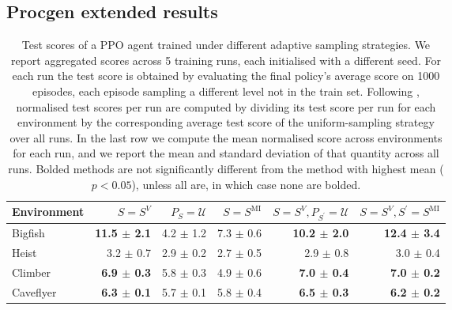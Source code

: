 \subsection{Procgen extended results}\label{c3:app:procgen_extended_results}

\begin{table}[H]
\caption{Test scores of a PPO agent trained under different adaptive sampling strategies. We report aggregated scores across 5 training runs, each initialised with a different seed. For each run the test score is obtained by evaluating the final policy’s average score on 1000 episodes, each episode sampling a different level not in the train set. Following \cite{raileanu2021UCB-DrAC}, normalised test scores per run are computed by dividing its test score per run for each environment by the corresponding average test score of the uniform-sampling strategy over all runs. In the last row we compute the mean normalised score across environments for each run, and we report the mean and standard deviation of that quantity across all runs. Bolded methods are not significantly different from the method with highest mean ($p<0.05$), unless all are, in which case none are bolded.}
\label{c3:tb:procgen_test_scores}
\vskip 0.15in
\begin{center}
\begin{small}
\begin{sc}
\begin{adjustbox}{max width=\linewidth}
\begin{tabular}{lrrrrr}
\toprule
                Environment &                  $S=S^V$ &       $P_S=\mathcal{U}$ &    $S=S^{\mathrm{MI}}$ & $S=S^V, P_{S^\prime}=\mathcal{U}$ & $S=S^V, S^\prime=S^{\mathrm{MI}}$ \\
\midrule
                    Bigfish &  \textbf{11.5 $\pm$ 2.1} &           4.2 $\pm$ 1.2 &          7.3 $\pm$ 0.6 &           \textbf{10.2 $\pm$ 2.0} &           \textbf{12.4 $\pm$ 3.4} \\
                      Heist &            3.2 $\pm$ 0.7 &           2.9 $\pm$ 0.2 &          2.7 $\pm$ 0.5 &                     2.9 $\pm$ 0.8 &                     3.0 $\pm$ 0.4 \\
                    Climber &   \textbf{6.9 $\pm$ 0.3} &           5.8 $\pm$ 0.3 &          4.9 $\pm$ 0.6 &            \textbf{7.0 $\pm$ 0.4} &            \textbf{7.0 $\pm$ 0.2} \\
                  Caveflyer &   \textbf{6.3 $\pm$ 0.1} &           5.7 $\pm$ 0.1 &          5.8 $\pm$ 0.4 &            \textbf{6.5 $\pm$ 0.3} &            \textbf{6.2 $\pm$ 0.2} \\

\end{tabular}
\end{adjustbox}
\end{sc}
\end{small}
\end{center}
\end{table}
